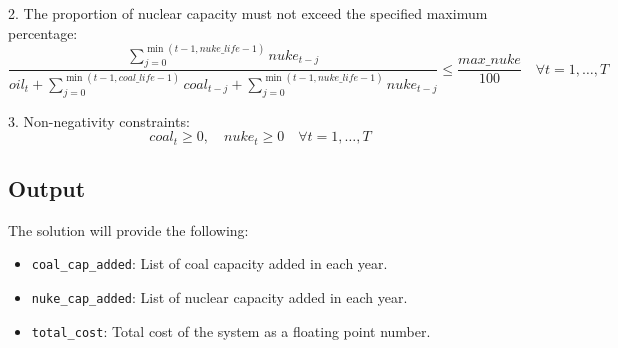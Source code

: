 \documentclass{article}
\begin{document}
2. The proportion of nuclear capacity must not exceed the specified maximum percentage:
\[
\frac{\sum_{j=0}^{\min(t-1, nuke\_life-1)} nuke_{t-j}}{oil_t + \sum_{j=0}^{\min(t-1, coal\_life-1)} coal_{t-j} + \sum_{j=0}^{\min(t-1, nuke\_life-1)} nuke_{t-j}} \leq \frac{max\_nuke}{100} \quad \forall t = 1, \ldots, T
\]

3. Non-negativity constraints:
\[
coal_t \geq 0, \quad nuke_t \geq 0 \quad \forall t = 1, \ldots, T
\]

\subsection*{Output}
The solution will provide the following:
\begin{itemize}
    \item \texttt{coal\_cap\_added}: List of coal capacity added in each year.
    \item \texttt{nuke\_cap\_added}: List of nuclear capacity added in each year.
    \item \texttt{total\_cost}: Total cost of the system as a floating point number.
\end{itemize}
\end{document}

